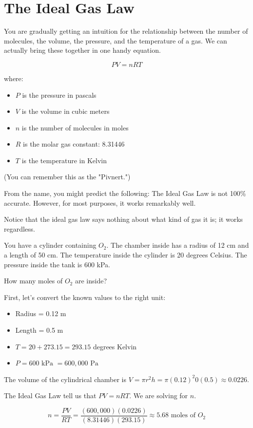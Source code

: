 \section{The Ideal Gas Law}
You are gradually getting an intuition for the relationship between the number of molecules, the volume, the pressure, and the temperature of a gas.
We can actually bring these together in one handy equation.

\begin{mdframed}[style=important, frametitle={Ideal Gas Law}]

$$PV = nRT$$

where:
\begin{itemize}
\item $P$ is the pressure in pascals
\item $V$ is the volume in cubic meters
\item $n$ is the number of molecules in moles
\item $R$ is the molar gas constant: 8.31446
\item $T$ is the temperature in Kelvin
\end{itemize}

(You can remember this as the "Pivnert.")

\end{mdframed}

From the name, you might predict the following: The Ideal Gas Law is not 100\% accurate. However, for most purposes, it works remarkably well. 

Notice that the ideal gas law says nothing about what kind of gas it is; it works regardless.

\begin{Exercise}[title={Ideal Gas Law}, label=ideal_gas]
 
You have a cylinder containing $O_2$. The chamber inside has a radius of 12 cm and a length of 50 cm. 
The temperature inside the cylinder is 20 degrees Celsius.
The pressure inside the tank is 600 kPa.

How many moles of $O_2$ are inside?

\end{Exercise}
\begin{Answer}[ref=ideal_gas]

First, let's convert the known values to the right unit:
\begin{itemize}
\item Radius = 0.12 m
\item Length = 0.5 m
\item $T = 20 + 273.15 = 293.15$ degrees Kelvin
\item $P = 600 \text{ kPa } = 600,000 \text{ Pa }$
\end{itemize}

The volume of the cylindrical chamber is $V = \pi r^2 h = \pi (0.12)^2 0 (0.5) \approx 0.0226$.

The Ideal Gas Law tell us that $PV = nRT$. We are solving for $n$.

$$n = \frac{PV}{RT} = \frac{(600,000)(0.0226)}{(8.31446)(293.15)} \approx 5.68 \text{ moles of } O_2$$

\end{Answer}

